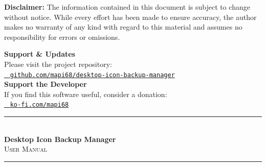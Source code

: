 \documentclass[a4paper,11pt]{article}
\begin{document}
\begin{center}
\begin{minipage}{0.7\textwidth}
{\begin{flushleft}
        \textbf{Disclaimer:} The information contained in this
        document is subject to change without notice.
        While every effort has been made to ensure accuracy, the
        author makes no warranty of any kind with
        regard to this material and assumes no responsibility for
        errors or omissions.
      \end{flushleft}
    }

  \end{minipage}

\end{center}

\vfill

\begin{center}
  \begin{tcolorbox}[
      enhanced,
      frame hidden,
      colback=blue!8,
      width=0.85\textwidth,
      arc=3mm,
      left=15pt,
      right=15pt,
      top=12pt,
      bottom=12pt
    ]
    \centering
    {\small\color{blue!70!black}\textbf{Support \& Updates}}\\[0.3cm]
    {\footnotesize\color{gray}Please visit the project repository:}\\[0.1cm]
    {\small\color{blue!60}%
      \href{https://github.com/mapi68/desktop-icon-backup-manager}{%
        \raisebox{-0.15em}{\faGithub}\ %
        \texttt{github.com/mapi68/desktop-icon-backup-manager}%
      }%
    }\\[0.3cm]
    {\small\color{orange!80!red}\textbf{Support the Developer}}\\[0.2cm]
    {\footnotesize\color{gray}If you find this software useful,
    consider a donation:}\\[0.1cm]
    {\small\color{orange!70!black}%
      \href{https://ko-fi.com/mapi68}{%
        \raisebox{-0.15em}{\faCoffee}\ %
        \texttt{ko-fi.com/mapi68}%
      }%
    }
  \end{tcolorbox}
\end{center}

\vspace{1cm}

\newpage
{}
\setcounter{page}{1}
\tableofcontents
\clearpage
\ifodd\value{page}\else
\mbox{}\clearpage
\fi
{}

\begin{center}
  {\color{primary!60!black}\rule{\textwidth}{1.5pt}}\\[0.4cm]
  {\fontsize{20}{24}\selectfont\bfseries\color{primary!90!black}%
  \faWindows\enspace Desktop Icon Backup Manager}\\[0.25cm]
  {\large\color{gray}\textsc{User Manual}}\\[0.4cm]
  {\color{warning}\rule{\textwidth}{2pt}}
\end{center}
\vspace{0.6cm}
\end{document}
